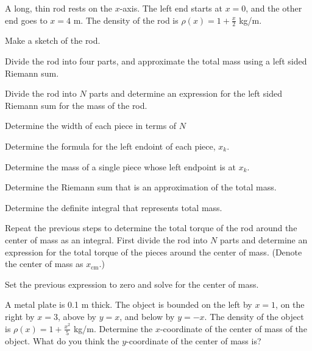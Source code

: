\begin{problem}
\item A long, thin rod rests on the $x$-axis. The left end starts at
  $x=0$, and the other end goes to $x=4$ m. The density of the rod is
  $\rho(x)=1+\frac{x}{2}$ kg/m.
  \begin{subproblem}
  \item Make a sketch of the rod.
    \vspace{2em}
  \item Divide the rod into four parts, and approximate the total mass
    using a left sided Riemann sum.
    \vfill
  \item Divide the rod into $N$ parts and determine an expression for
    the left sided Riemann sum for the mass of the rod.
    \begin{subsubproblem}
      \item Determine the width of each piece in terms of $N$
        \vspace{3em}
      \item Determine the formula for the left endoint of each piece, $x_k$.
          \vfill
      \item Determine the mass of a single piece whose left endpoint is at $x_k$.
        \vfill
      \item Determine the Riemann sum that is an approximation of the total mass.
        \vfill
      \item Determine the definite integral that represents total mass.
        \vspace{3em}
    \end{subsubproblem}

    \clearpage

  \item Repeat the previous steps to determine the total torque of the rod around
    the center of mass as an integral. First divide the rod into $N$ parts and determine an expression for
    the total torque of the pieces around the center of mass. (Denote
    the center of mass as $x_{\mathrm{cm}}$.)
    \vfill

  \item Set the previous expression to zero and solve  for the center of mass.
    \vfill

  \end{subproblem}

  \clearpage

\item A metal plate is 0.1 m thick. The object is bounded on the left
  by $x=1$, on the right by $x=3$, above by $y=x$, and below by
  $y=-x$. The density of the object is $\rho(x)=1+\frac{x^2}{5}$
  kg/m. Determine the $x$-coordinate of the center of mass of the
  object. What do you think the $y$-coordinate of the center of mass
  is?

  \vfill


\end{problem}

